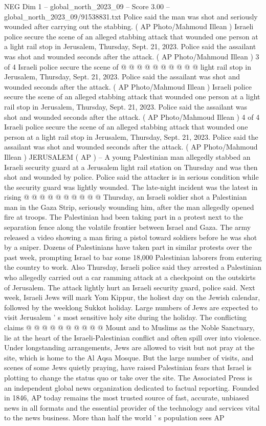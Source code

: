 \begin{textsample}{NEG Dim 1 – global\_north\_2023\_09 – Score 3.00 – global\_north\_2023\_09/91538831.txt}
Police said the man was shot and seriously wounded after carrying out the stabbing. ( AP Photo/Mahmoud Illean ) Israeli police secure the scene of an alleged stabbing attack that wounded one person at a light rail stop in Jerusalem, Thursday, Sept. 21, 2023.
Police said the assailant was shot and wounded seconds after the attack. ( AP Photo/Mahmoud Illean ) 3 of 4 Israeli police secure the scene of @ @ @ @ @ @ @ @ @ @ light rail stop in Jerusalem, Thursday, Sept. 21, 2023.
Police said the assailant was shot and wounded seconds after the attack. ( AP Photo/Mahmoud Illean ) Israeli police secure the scene of an alleged stabbing attack that wounded one person at a light rail stop in Jerusalem, Thursday, Sept. 21, 2023.
Police said the assailant was shot and wounded seconds after the attack. ( AP Photo/Mahmoud Illean ) 4 of 4 Israeli police secure the scene of an alleged stabbing attack that wounded one person at a light rail stop in Jerusalem, Thursday, Sept. 21, 2023.
Police said the assailant was shot and wounded seconds after the attack. ( AP Photo/Mahmoud Illean ) JERUSALEM ( AP ) -- A young Palestinian man allegedly stabbed an Israeli security guard at a Jerusalem light rail station on Thursday and was then shot and wounded by police.
Police said the attacker is in serious condition while the security guard was lightly wounded.
The late-night incident was the latest in rising @ @ @ @ @ @ @ @ @ @ Thursday, an Israeli soldier shot a Palestinian man in the Gaza Strip, seriously wounding him, after the man allegedly opened fire at troops.
The Palestinian had been taking part in a protest next to the separation fence along the volatile frontier between Israel and Gaza.
The army released a video showing a man firing a pistol toward soldiers before he was shot by a sniper.
Dozens of Palestinians have taken part in similar protests over the past week, prompting Israel to bar some 18,000 Palestinian laborers from entering the country to work.
Also Thursday, Israeli police said they arrested a Palestinian who allegedly carried out a car ramming attack at a checkpoint on the outskirts of Jerusalem.
The attack lightly hurt an Israeli security guard, police said.
Next week, Israeli Jews will mark Yom Kippur, the holiest day on the Jewish calendar, followed by the weeklong Sukkot holiday.
Large numbers of Jews are expected to visit Jerusalem ' s most sensitive holy site during the holiday.
The conflicting claims @ @ @ @ @ @ @ @ @ @ Mount and to Muslims as the Noble Sanctuary, lie at the heart of the Israeli-Palestinian conflict and often spill over into violence.
Under longstanding arrangements, Jews are allowed to visit but not pray at the site, which is home to the Al Aqsa Mosque.
But the large number of visits, and scenes of some Jews quietly praying, have raised Palestinian fears that Israel is plotting to change the status quo or take over the site.
The Associated Press is an independent global news organization dedicated to factual reporting.
Founded in 1846, AP today remains the most trusted source of fast, accurate, unbiased news in all formats and the essential provider of the technology and services vital to the news business.
More than half the world ' s population sees AP


\end{textsample}

